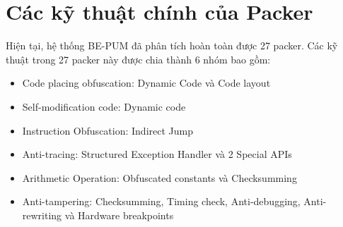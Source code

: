 \section{Các kỹ thuật chính của Packer}

\hspace{0.5cm}Hiện tại, hệ thống BE-PUM đã phân tích hoàn toàn được 27 packer. Các kỹ thuật trong 27 packer này được chia thành 6 nhóm bao gồm:

\begin{itemize}
\item{Code placing obfuscation: Dynamic Code và Code layout}
\item{Self-modification code: Dynamic code}
\item{Instruction Obfuscation: Indirect Jump}
\item{Anti-tracing: Structured Exception Handler và 2 Special APIs}
\item{Arithmetic Operation: Obfuscated constants và Checksumming}
\item{Anti-tampering: Checksumming, Timing check, Anti-debugging, Anti-rewriting và Hardware breakpoints}
\end{itemize}

